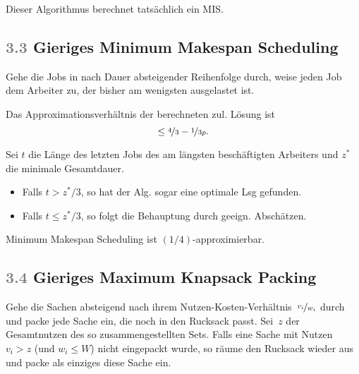 \documentclass{cheat-sheet}
\newcommand{\Problem}[1]{\textcolor{ProblemColor}{\textbf{#1}}}
\newcommand{\scriptSection}[1]{\textcolor{gray}{#1}\enspace}
\begin{document}
\begin{satz}
  Dieser Algorithmus berechnet tatsächlich ein MIS\@.
\end{satz}

\subsection{\scriptSection{3.3} Gieriges \Problem{Minimum Makespan Scheduling}}

\begin{alg}
  Gehe die Jobs in nach Dauer absteigender Reihenfolge durch, weise jeden Job dem Arbeiter zu, der bisher am wenigsten ausgelastet ist.
\end{alg}

\begin{satz}
  Das Approximationsverhältnis der berechneten zul. Lösung ist
  \[ \leq \nicefrac{4}{3} - \nicefrac{1}{3 p}. \]
\end{satz}

\begin{beweisskizze}
  Sei $t$ die Länge des letzten Jobs des am längsten beschäftigten Arbeiters und $z^*$ die minimale Gesamtdauer.
  \begin{itemize}
    \item Falls $t > z^*/3$, so hat der Alg. sogar eine optimale Lsg gefunden.
    \item Falls $t \leq z^*/3$, so folgt die Behauptung durch geeign. Abschätzen.
  \end{itemize}
\end{beweisskizze}

\begin{kor}
  Minimum Makespan Scheduling ist $(1/4)$-approximierbar.
\end{kor}

\subsection{\scriptSection{3.4} Gieriges \Problem{Maximum Knapsack Packing}}

\begin{alg}
  Gehe die Sachen absteigend nach ihrem Nutzen-Kosten-Verhältnis~$\nicefrac{v_i}{w_i}$ durch und packe jede Sache ein, die noch in den Rucksack passt.
  Sei~$z$ der Gesamtnutzen des so zusammengestellten Sets.
  Falls eine Sache mit Nutzen $v_i > z$ (und $w_i \leq W$) nicht eingepackt wurde, so räume den Rucksack wieder aus und packe als einziges diese Sache ein.
\end{alg}
\end{document}
